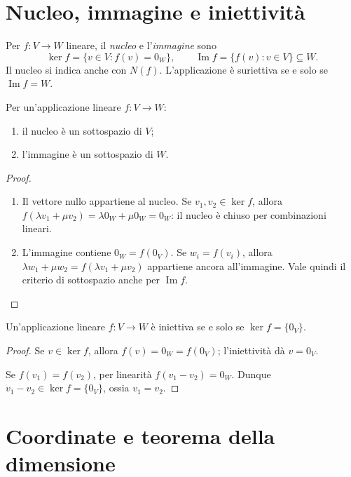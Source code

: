 \section{Nucleo, immagine e iniettività}
\begin{definizione}
Per $f:V\to W$ lineare, il \emph{nucleo} e l'\emph{immagine} sono
\[
 \ker f=\{v\in V:f(v)=0_W\},\qquad
 \operatorname{Im}f=\{f(v):v\in V\}\subseteq W.
\]
Il nucleo si indica anche con $N(f)$. L'applicazione è suriettiva se e solo se $\operatorname{Im}f=W$.
\end{definizione}
\begin{teorema}
Per un'applicazione lineare $f:V\to W$:
\begin{enumerate}[label=\arabic*.]
\item il nucleo è un sottospazio di $V$;
\item l'immagine è un sottospazio di $W$.
\end{enumerate}
\end{teorema}
\begin{proof}
\begin{enumerate}[label=\arabic*.]
\item {} Il vettore nullo appartiene al nucleo. Se $v_1,v_2\in\ker f$, allora $f(\lambda v_1+\mu v_2)=\lambda0_W+\mu0_W=0_W$: il nucleo è chiuso per combinazioni lineari.
\item {} L'immagine contiene $0_W=f(0_V)$. Se $w_i=f(v_i)$, allora $\lambda w_1+\mu w_2=f(\lambda v_1+\mu v_2)$ appartiene ancora all'immagine. Vale quindi il criterio di sottospazio anche per $\operatorname{Im}f$.
\end{enumerate}
\end{proof}
\begin{teorema}
Un'applicazione lineare $f:V\to W$ è iniettiva se e solo se $\ker f=\{0_V\}$.
\end{teorema}
\begin{proof}
\passomath{\Rightarrow} Se $v\in\ker f$, allora $f(v)=0_W=f(0_V)$; l'iniettività dà $v=0_V$.

\passomath{\Leftarrow} Se $f(v_1)=f(v_2)$, per linearità $f(v_1-v_2)=0_W$. Dunque $v_1-v_2\in\ker f=\{0_V\}$, ossia $v_1=v_2$.
\end{proof}

\section{Coordinate e teorema della dimensione}

